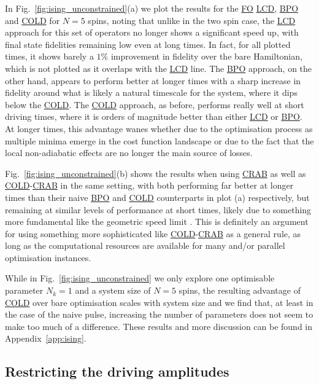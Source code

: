 \documentclass[a4paper,oneside,11pt]{book}
\newcommand{\acrref}[1]{\hyperref[acr:#1]{#1}}
\begin{document}
In Fig.~\ref{fig:ising_unconstrained}(a) we plot the results for the \acrref{FO} \acrref{LCD}, \acrref{BPO} and \acrref{COLD} for $N=5$ spins, noting that unlike in the two spin case, the \acrref{LCD} approach for this set of operators no longer shows a significant speed up, with final state fidelities remaining low even at long times. In fact, for all plotted times, it shows barely a $1\%$ improvement in fidelity over the bare Hamiltonian, which is not plotted as it overlaps with the \acrref{LCD} line. The \acrref{BPO} approach, on the other hand, appears to perform better at longer times with a sharp increase in fidelity around what is likely a natural timescale for the system, where it dips below the \acrref{COLD}. The \acrref{COLD} approach, as before, performs really well at short driving times, where it is orders of magnitude better than either \acrref{LCD} or \acrref{BPO}. At longer times, this advantage wanes whether due to the optimisation process as multiple minima emerge in the cost function landscape or due to the fact that the local non-adiabatic effects are no longer the main source of losses. 

Fig.~\ref{fig:ising_unconstrained}(b) shows the results when using \acrref{CRAB} as well as \acrref{COLD}-\acrref{CRAB} in the same setting, with both performing far better at longer times than their naive \acrref{BPO} and \acrref{COLD} counterparts in plot (a) respectively, but remaining at similar levels of performance at short times, likely due to something more fundamental like the geometric speed limit \cite{bukov_geometric_2019}. This is definitely an argument for using something more sophisticated like \acrref{COLD}-\acrref{CRAB} as a general rule, as long as the computational resources are available for many and/or parallel optimisation instances.

While in Fig.~\ref{fig:ising_unconstrained} we only explore one optimisable parameter $N_k = 1$ and a system size of $N=5$ spins, the resulting advantage of \acrref{COLD} over bare optimisation scales with system size and we find that, at least in the case of the naive pulse, increasing the number of parameters does not seem to make too much of a difference. These results and more discussion can be found in Appendix~\ref{app:ising}.

\subsection{Restricting the driving amplitudes}\label{sec:6.2.1_restricting_amps}
\end{document}
